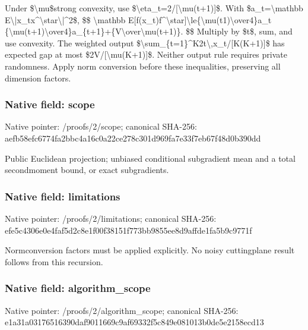 \documentclass[10pt,a4paper]{article}
\begin{document}
Under \$\textbackslash{}mu\$strong convexity, use \$\textbackslash{}eta\_t=2/[\textbackslash{}mu(t+1)]\$. With \$a\_t=\textbackslash{}mathbb E\textbackslash{}|x\_tx\textasciicircum{}\textbackslash{}star\textbackslash{}|\textasciicircum{}2\$,
\$\$
\textbackslash{}mathbb E[f(x\_t)f\textasciicircum{}\textbackslash{}star]\textbackslash{}le\{\textbackslash{}mu(t1)\textbackslash{}over4\}a\_t
\{\textbackslash{}mu(t+1)\textbackslash{}over4\}a\_\{t+1\}\allowbreak{}+\{V\textbackslash{}over\textbackslash{}mu(t+1)\}.
\$\$
Multiply by \$t\$, sum, and use convexity. The weighted output
\$\textbackslash{}sum\_\{t=1\}\textasciicircum{}K2t\textbackslash{},x\_t/[K(K+1)]\$ has expected gap at most \$2V/[\textbackslash{}mu(K+1)]\$. Neither output rule requires private randomness. Apply norm conversion before these inequalities, preserving all dimension factors.


\subsubsection{Native field: scope}


Native pointer: /proofs/2/scope; canonical SHA-256: aefb58efc6774fa2bbc4a16c\allowbreak{}0a22ce278c301d969fa7e33f\allowbreak{}7eb67f48d0b390dd


Public Euclidean projection; unbiased conditional subgradient mean and a total secondmoment bound, or exact subgradients.


\subsubsection{Native field: limitations}


Native pointer: /proofs/2/limitations; canonical SHA-256: efe5c4306e0e4faf5d2c8e1f\allowbreak{}00f38151f773bb9855ee8d9a\allowbreak{}ffde1fa5b9c9771f


Normconversion factors must be applied explicitly. No noisy cuttingplane result follows from this recursion.


\subsubsection{Native field: algorithm\_scope}


Native pointer: /proofs/2/algorithm\_scope; canonical SHA-256: e1a31a03176516390daf9011\allowbreak{}669c9af69332f5c849e08101\allowbreak{}3b0de5e2158ecd13
\end{document}
